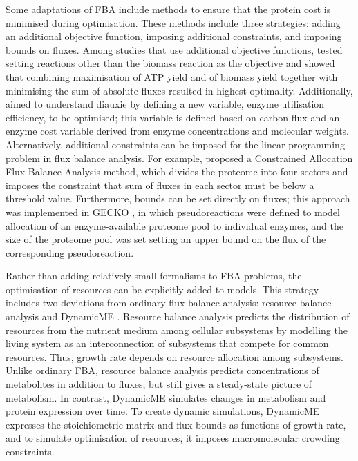 Some adaptations of FBA include methods to ensure that the protein cost is minimised during optimisation.
These methods include three strategies: adding an additional objective function, imposing additional constraints, and imposing bounds on fluxes.
Among studies that use additional objective functions, \textcite{schuetzMultidimensionalOptimalityMicrobial2012} tested setting reactions other than the biomass reaction as the objective and showed that combining maximisation of ATP yield and of biomass yield together with minimising the sum of absolute fluxes resulted in highest optimality.
Additionally, \textcite{wangGrowthStrategyMicrobes2019} aimed to understand diauxie by defining a new variable, enzyme utilisation efficiency, to be optimised; this variable is defined based on carbon flux and an enzyme cost variable derived from enzyme concentrations and molecular weights.
Alternatively, additional constraints can be imposed for the linear programming problem in flux balance analysis.
For example, \textcite{moriConstrainedAllocationFlux2016} proposed a Constrained Allocation Flux Balance Analysis method, which divides the proteome into four sectors and imposes the constraint that sum of fluxes in each sector must be below a threshold value.
Furthermore, bounds can be set directly on fluxes; this approach was implemented in GECKO \parencite{sanchezImprovingPhenotypePredictions2017,domenzainReconstructionCatalogueGenomescale2022}, in which pseudoreactions were defined to model allocation of an enzyme-available proteome pool to individual enzymes, and the size of the proteome pool was set setting an upper bound on the flux of the corresponding pseudoreaction.

Rather than adding relatively small formalisms to FBA problems, the optimisation of resources can be explicitly added to models.
This strategy includes two deviations from ordinary flux balance analysis: resource balance analysis \parencite{goelzerCellDesignBacteria2011} and DynamicME \parencite{yangDynamicMEDynamicSimulation2019}.
Resource balance analysis predicts the distribution of resources from the nutrient medium among cellular subsystems by modelling the living system as an interconnection of subsystems that compete for common resources.
Thus, growth rate depends on resource allocation among subsystems.
Unlike ordinary FBA, resource balance analysis predicts concentrations of metabolites in addition to fluxes, but still gives a steady-state picture of metabolism.
In contrast, DynamicME simulates changes in metabolism and protein expression over time.
To create dynamic simulations, DynamicME expresses the stoichiometric matrix and flux bounds as functions of growth rate, and to simulate optimisation of resources, it imposes macromolecular crowding constraints.

